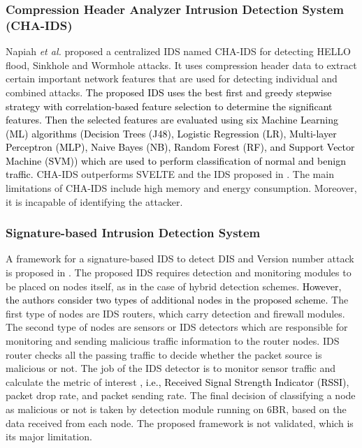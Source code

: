 \documentclass[10pt,journal,sort & compress]{IEEEtran}
\begin{document}
\subsubsection*{Compression Header Analyzer Intrusion Detection System (CHA-IDS)}
Napiah \textit{et al.} \cite{Napiah2018} proposed a centralized IDS named CHA-IDS for detecting HELLO flood, Sinkhole and Wormhole
attacks. It uses compression header data to extract certain important network features that are used for detecting individual and combined attacks. \textcolor{black}{The proposed IDS uses the best first and greedy stepwise strategy with correlation-based feature selection to determine the significant features.} \textcolor{black}{Then the selected features are evaluated using six Machine Learning (ML) algorithms (Decision Trees (J48), Logistic Regression (LR), Multi-layer Perceptron (MLP), Naive Bayes (NB), Random Forest (RF), and Support Vector Machine (SVM)) which are used to perform classification of normal and benign traffic.} CHA-IDS outperforms SVELTE and the IDS proposed in \cite{pongle2015real}. The main limitations of CHA-IDS include high memory and energy consumption. Moreover, it is incapable of identifying the attacker. 

\subsubsection*{Signature-based Intrusion Detection System}
A framework for a signature-based IDS to detect DIS and Version number attack is proposed in \cite{ioulianou2018signature}. The proposed IDS requires detection and monitoring modules to be placed on nodes itself, as in the case of hybrid detection schemes. \textcolor{black}{However, the authors consider two types of additional nodes in the proposed scheme.} The first type of nodes are IDS routers, which carry detection and firewall modules. The second type of nodes are sensors or IDS detectors which are responsible for monitoring and sending malicious traffic information to the router nodes. IDS router checks all the passing traffic to decide whether the packet source is malicious or not. The job of the IDS detector is to monitor sensor traffic and calculate the metric of interest \textcolor{black}{, i.e.,  Received Signal Strength Indicator (RSSI)}, packet drop rate, and packet sending rate. The final decision of classifying a node as malicious or not is taken by detection module running on $ 6 $BR, based on the data received from each node. The proposed framework is not validated, which is its major limitation. 
\end{document}
